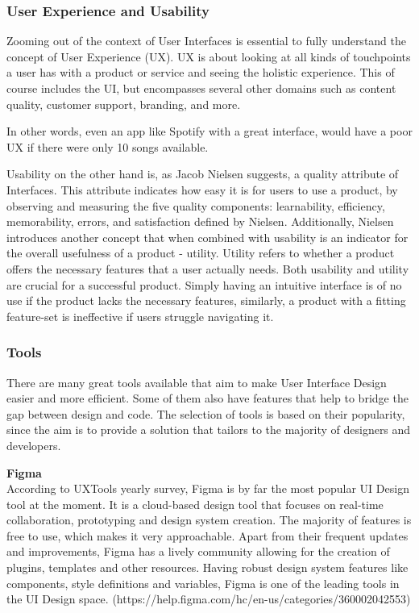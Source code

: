 \subsubsection{User Experience and Usability}
Zooming out of the context of User Interfaces is essential to fully understand the concept of User
Experience (UX). UX is about looking at all kinds of touchpoints a user has with a product or
service and seeing the holistic experience. This of course includes the UI, but encompasses several
other domains such as content quality, customer support, branding, and more.

In other words, even an app like Spotify with a great interface, would have a poor UX if there were
only 10 songs available.

Usability on the other hand is, as Jacob Nielsen suggests, a quality attribute of Interfaces. This
attribute indicates how easy it is for users to use a product, by observing and measuring the five
quality components: learnability, efficiency, memorability, errors, and satisfaction
defined by Nielsen. Additionally, Nielsen introduces another concept that when combined with
usability is an indicator for the overall usefulness of a product - utility. Utility refers to
whether a product offers the necessary features that a user actually needs. Both usability and
utility are crucial for a successful product. Simply having an intuitive interface is of no use if
the product lacks the necessary features, similarly, a product with a fitting feature-set is
ineffective if users struggle navigating it.

\subsubsection{Tools}
There are many great tools available that aim to make User Interface Design easier and more
efficient. Some of them also have features that help to bridge the gap between design and code. The
selection of tools is based on their popularity, since the aim is to provide a solution that
tailors to the majority of designers and developers. %

\textbf{Figma}\\
According to UXTools yearly survey, Figma is by far the most popular UI Design tool at the moment.
 It is a cloud-based design tool that focuses on real-time
collaboration, prototyping and design system creation. The majority of features is free to use,
which makes it very approachable. Apart from their frequent updates and improvements, Figma has a
lively community allowing for the creation of plugins, templates and other resources. Having robust
design system features like components, style definitions and variables, Figma is one of the leading
tools in the UI Design space. (https://help.figma.com/hc/en-us/categories/360002042553)

